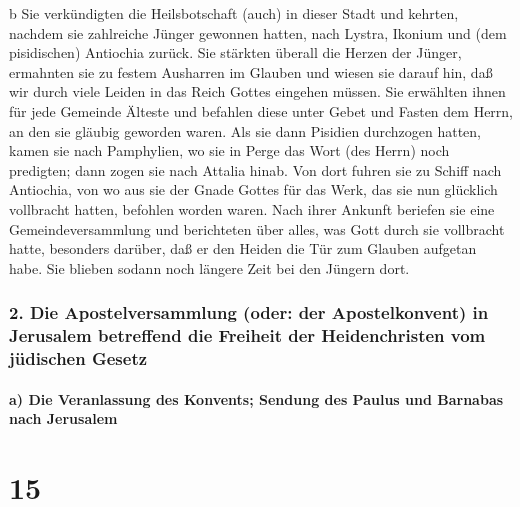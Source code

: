 b Sie verkündigten die Heilsbotschaft (auch) in dieser Stadt und
kehrten, nachdem sie zahlreiche Jünger gewonnen hatten, nach Lystra,
Ikonium und (dem pisidischen) Antiochia zurück.  Sie
stärkten überall die Herzen der Jünger, ermahnten sie zu festem
Ausharren im Glauben und wiesen sie darauf hin, daß wir durch viele
Leiden in das Reich Gottes eingehen müssen.  Sie
erwählten ihnen für jede Gemeinde Älteste und befahlen diese unter Gebet
und Fasten dem Herrn, an den sie gläubig geworden waren. 
Als sie dann Pisidien durchzogen hatten, kamen sie nach Pamphylien,
 wo sie in Perge das Wort (des Herrn) noch predigten;
dann zogen sie nach Attalia hinab.  Von dort fuhren sie
zu Schiff nach Antiochia, von wo aus sie der Gnade Gottes für das Werk,
das sie nun glücklich vollbracht hatten, befohlen worden waren.
 Nach ihrer Ankunft beriefen sie eine Gemeindeversammlung
und berichteten über alles, was Gott durch sie vollbracht hatte,
besonders darüber, daß er den Heiden die Tür zum Glauben aufgetan habe.
 Sie blieben sodann noch längere Zeit bei den Jüngern
dort.

\hypertarget{die-apostelversammlung-oder-der-apostelkonvent-in-jerusalem-betreffend-die-freiheit-der-heidenchristen-vom-juxfcdischen-gesetz}{%
\subsubsection{2. Die Apostelversammlung (oder: der Apostelkonvent) in
Jerusalem betreffend die Freiheit der Heidenchristen vom jüdischen
Gesetz}\label{die-apostelversammlung-oder-der-apostelkonvent-in-jerusalem-betreffend-die-freiheit-der-heidenchristen-vom-juxfcdischen-gesetz}}

\hypertarget{a-die-veranlassung-des-konvents-sendung-des-paulus-und-barnabas-nach-jerusalem}{%
\paragraph{a) Die Veranlassung des Konvents; Sendung des Paulus und
Barnabas nach
Jerusalem}\label{a-die-veranlassung-des-konvents-sendung-des-paulus-und-barnabas-nach-jerusalem}}

\hypertarget{section-14}{%
\section{15}\label{section-14}}

